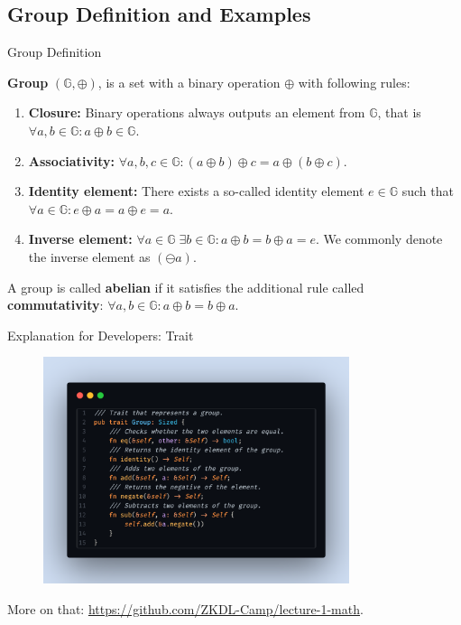\documentclass{beamer}
\begin{document}
    \subsection{Group Definition and Examples}
    \begin{frame}{Group Definition}
      \begin{definition}
        \textbf{Group} $(\mathbb{G}, \oplus)$, is a set with a binary operation $\oplus$ with following rules:
        \begin{enumerate}
            \item \textbf{Closure:} Binary operations always outputs an element from $\mathbb{G}$, that is $\forall a,b \in \mathbb{G}: a \oplus b \in \mathbb{G}$.
            \item \textbf{Associativity:} $\forall a,b,c \in \mathbb{G}: (a \oplus b)\oplus c = a \oplus (b \oplus c)$.
            \item \textbf{Identity element:} There exists a so-called identity element $e \in \mathbb{G}$ such that $\forall a \in \mathbb{G}: e \oplus a = a \oplus e = a$.
            \item \textbf{Inverse element:} $\forall a \in \mathbb{G} \; \exists b \in \mathbb{G}: a\oplus b = b \oplus a = e$. We commonly denote the inverse element as $(\ominus a)$.
        \end{enumerate}
    \end{definition}

    \begin{definition}
        A group is called \textbf{abelian} if it satisfies the additional rule called \textbf{commutativity}: $\forall a,b \in \mathbb{G}: a \oplus b = b \oplus a$.
    \end{definition}
    \end{frame}

    \begin{frame}{Explanation for Developers: Trait}
      \begin{center}
        \begin{figure}
          \includegraphics[width=0.8\textwidth]{images/lecture_1/group_in_rust.png}
          \label{fig:group_in_rust}
        \end{figure}

        More on that: \url{https://github.com/ZKDL-Camp/lecture-1-math}.
      \end{center}
    \end{frame}
\end{document}
